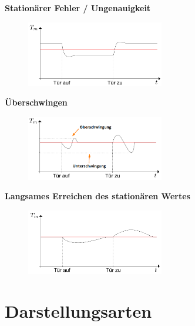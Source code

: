 \documentclass[
  10pt,
  a4paper,
  onecolumn]{article}
\numberwithin{equation}{section}
\begin{document}
\textbf{Stationärer Fehler / Ungenauigkeit}

\begin{figure}[H]

{\centering \includegraphics[width=6cm,height=\textheight]{images/storverhalten/storverhalten_stationary.png}

}

\end{figure}

\textbf{Überschwingen}

\begin{figure}[H]

{\centering \includegraphics[width=6cm,height=\textheight]{images/storverhalten/uber_unterschwingung.png}

}

\end{figure}

\textbf{Langsames Erreichen des stationären Wertes}

\begin{figure}[H]

{\centering \includegraphics[width=6cm,height=\textheight]{images/storverhalten/slow.png}

}

\end{figure}

\hypertarget{darstellungsarten}{%
\section{Darstellungsarten}\label{darstellungsarten}}
\end{document}
